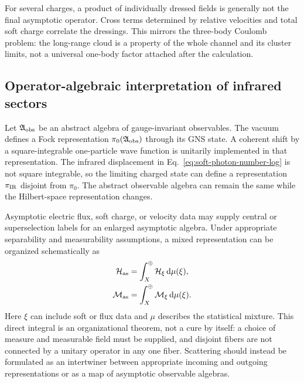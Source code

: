 For several charges, a product of individually dressed fields is generally
not the final asymptotic operator.  Cross terms determined by relative
velocities and total soft charge correlate the dressings.  This mirrors the
three-body Coulomb problem: the long-range cloud is a property of the whole
channel and its cluster limits, not a universal one-body factor attached after
the calculation.

\subsection{Operator-algebraic interpretation of infrared sectors}
\label{subsec:operator-algebra-ir}

Let $\mathfrak{A}_{\mathrm{obs}}$ be an abstract algebra of gauge-invariant
observables.  The vacuum defines a Fock representation
$\pi_0(\mathfrak{A}_{\mathrm{obs}})$ through its GNS state.  A coherent shift by a
square-integrable one-particle wave function is unitarily implemented in that
representation.  The infrared displacement in
Eq.~\eqref{eq:soft-photon-number-log} is not square integrable, so the limiting
charged state can define a representation $\pi_{\mathrm{IR}}$ disjoint from
$\pi_0$.  The abstract observable algebra can remain the same while the
Hilbert-space representation changes.

Asymptotic electric flux, soft charge, or velocity data may supply central or
superselection labels for an enlarged asymptotic algebra.  Under appropriate
separability and measurability assumptions, a mixed representation can be
organized schematically as
\begin{align}
  \mathcal{H}_{\mathrm{as}}
  &=\int_X^\oplus\mathcal{H}_\xi\,\mathrm{d}\mu(\xi),
  \label{eq:ir-sector-direct-integral}\\
  \mathcal{M}_{\mathrm{as}}
  &=\int_X^\oplus\mathcal{M}_\xi\,\mathrm{d}\mu(\xi).
  \label{eq:ir-algebra-direct-integral}
\end{align}
Here $\xi$ can include soft or flux data and $\mu$ describes the statistical
mixture.  This direct integral is an organizational theorem, not a cure by
itself: a choice of measure and measurable field must be supplied, and
disjoint fibers are not connected by a unitary operator in any one fiber.
Scattering should instead be formulated as an intertwiner between appropriate
incoming and outgoing representations or as a map of asymptotic observable
algebras.

